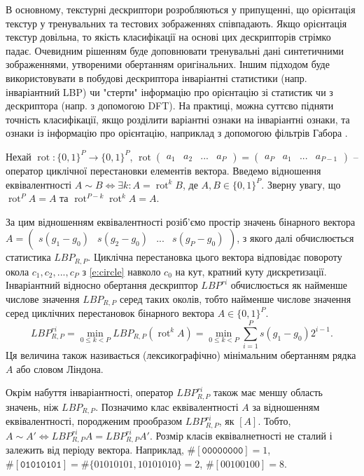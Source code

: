 В основному, текстурні дескриптори розробляються у припущенні, що орієнтація текстур у тренувальних та тестових зображеннях співпадають.
Якщо орієнтація текстур довільна, то якість класифікації на основі цих дескрипторів стрімко падає. 
Очевидним рішенням буде доповнювати тренувальні дані синтетичними зображеннями, утвореними обертанням оригінальних. 
Іншим підходом буде використовувати в побудові дескриптора інваріантні статистики (напр. інваріантний LBP) чи 
"стерти"{} інформацію про орієнтацію зі статистик чи з дескриптора (напр. з допомогою DFT). 
На практиці, можна суттєво підняти точність класифікації, якщо розділити варіантні ознаки на інваріантні ознаки, та ознаки із інформацію про орієнтацію, наприклад з допомогою фільтрів Габора \cite{guo2010lbpv}. 

Нехай $\operatorname{rot} : \{0,1\}^P \to \{0,1\}^P$, 
$\operatorname{rot} \begin{pmatrix}a_1 & a_2 & ... & a_P\end{pmatrix} = \begin{pmatrix}a_P & a_1 & ... & a_{P-1}\end{pmatrix}$ 
-- оператор циклічної перестановки елементів вектора.
Введемо відношення еквівалентності $A\sim B \iff \exists k: A = \operatorname{rot}^k B$, де $A,B \in \{0,1\}^P$.
Зверну увагу, що $\operatorname{rot}^P A = A$ та $\operatorname{rot}^{P-k} \operatorname{rot}^k A = A$.

За цим відношенням еквівалентності розіб'ємо простір значень бінарного вектора $A = \begin{pmatrix}
    s(g_1 - g_0) & s(g_2 - g_0) & ... & s(g_P - g_0)
\end{pmatrix}$, з якого далі обчислюється статистика $LBP_{R,P}$. 
Циклічна перестановка цього вектора відповідає повороту окола $c_1, c_2, ..., c_P$ з \ref{e:circle} навколо $c_0$ на кут, кратний куту дискретизації.
Інваріантний відносно обертання дескриптор $LBP^{ri}$ обчислюється як найменше числове значення $LBP_{R,P}$ серед таких околів,
тобто найменше числове значення серед циклічних перестановок бінарного вектора $A \in \{0,1\}^P$.
\begin{equation}
    LBP^{ri}_{R,P} = \min_{0\le k < P} LBP_{R,P} \left( \operatorname{rot}^k A \right) 
    = \min_{0\le k < P} \sum_{i=1}^P s(g_1 - g_0) 2^{i-1}.
\end{equation}
Ця величина також називається (лексикографічно) мінімальним обертанням рядка $A$ або словом Ліндона.   

Окрім набуття інваріантності, оператор $LBP^{ri}_{R,P}$ також має меншу область значень, ніж $LBP_{R,P}$.
Позначимо клас еквівалентності $A$ за відношенням еквівалентності, породженим прообразом $LBP^{ri}_{R,P}$, як $[A]$.
Тобто, $A \sim A' \iff LBP^{ri}_{R,P} A = LBP^{ri}_{R,P} A'$.
Розмір класів еквівалнетності не сталий і залежить від періоду вектора. 
Наприклад, $\# [\texttt{00000000}] = 1$, $\# [\texttt{01010101}] = \# \{01010101,10101010\} = 2$, $\# [00100100] = 8$.

